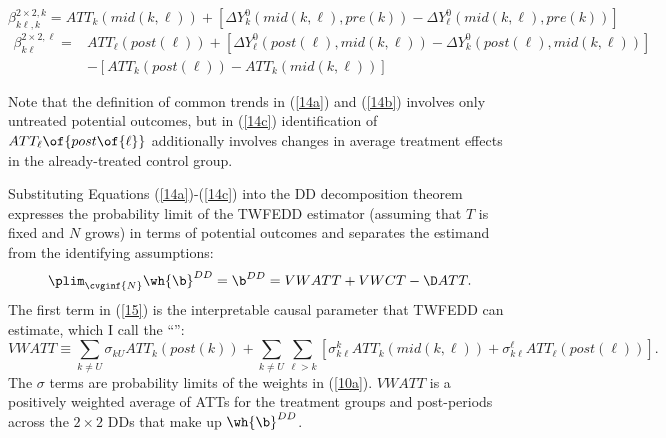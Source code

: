 \documentclass[12pt]{article}
\newcommand{\highlightB}[1]{{\emph{\color{MyBlue}{#1}}}}
\theoremstyle{definition}
\begin{document}
\begin{equation}
    \tag{14b} \label{14b}
    \beta_{k \ell, k}^{2 \times 2, k}= {ATT}_k({mid}(k, \ell))+\left[\Delta Y_k^0({mid}(k, \ell), {pre}(k))-\Delta Y_{\ell}^0({mid}(k, \ell), {pre}(k))\right]
\end{equation}
\begin{equation}
    \tag{14c} \label{14c}
    \begin{aligned}
        \beta_{k \ell}^{2 \times 2, \ell} = & {ATT}_{\ell}({post}(\ell))+\left[\Delta Y_{\ell}^0({post}(\ell), {mid}(k, \ell))-\Delta Y_k^0({post}(\ell), {mid}(k, \ell))\right] \\
        & - \left[{ATT}_k({post}(\ell))-{ATT}_k({mid}(k, \ell))\right]
    \end{aligned}
\end{equation}

\setcounter{equation}{14}

Note that the definition of common trends in (\ref{14a}) and (\ref{14b}) involves only untreated potential outcomes, but in (\ref{14c}) identification of $ATT_{\ell}\of{post\of{\ell}}$ additionally involves changes in average treatment effects in the already-treated control group. 

Substituting Equations (\ref{14a})-(\ref{14c}) into the DD decomposition theorem expresses the probability limit of the TWFEDD estimator (assuming that $T$ is fixed and $N$ grows) in terms of potential outcomes and separates the estimand from the identifying assumptions:
\begin{equation}
    \label{15}
    \plim_{\cvginf{N}} \wh{\b}^{DD} = \b^{DD} = VWATT + VWCT - \D ATT.
\end{equation}
The first term in (\ref{15}) is the interpretable causal parameter that TWFEDD can estimate, which I call the  ``\highlightB{variance-weighted average treatment effect on the treated (VWATT)}'':
\begin{equation}
    \label{15a} \tag{15a}
    V W A T T \equiv \sum_{k \neq U} \sigma_{k U} A T T_k({post}(k))+\sum_{k \neq U} \sum_{\ell>k}\left[\sigma_{k \ell}^k A T T_k({mid}(k, \ell))+\sigma_{k \ell}^{\ell} A T T_{\ell}({post}(\ell))\right].
\end{equation}
The $\sigma$ terms are probability limits of the weights in (\ref{10a}). $VWATT$ is a positively weighted average of ATTs for the treatment groups and post-periods across the $2\times2$ DDs that make up $\wh{\b}^{DD}$.
\end{document}
